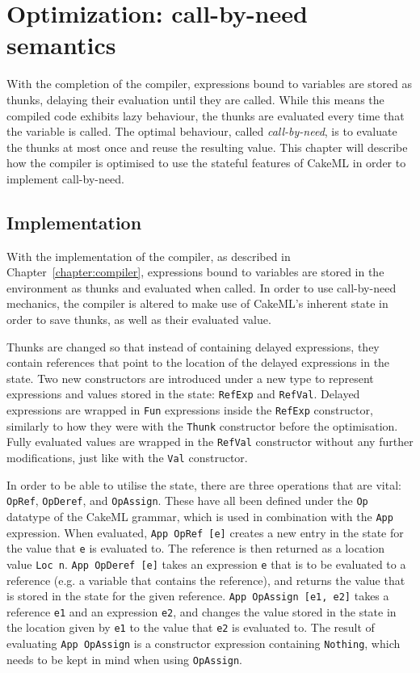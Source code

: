 \chapter{Optimization: call-by-need semantics}
With the completion of the compiler, expressions bound to variables are stored
as thunks, delaying their evaluation until they are called. While this means
the compiled code exhibits lazy behaviour, the thunks are evaluated every
time that the variable is called. The optimal behaviour, called
\textit{call-by-need}, is to evaluate the thunks at most once and reuse the
resulting value. This chapter will describe how the compiler is optimised to
use the stateful features of CakeML in order to implement call-by-need.

\section{Implementation}
\label{cbn:impl}
With the implementation of the compiler, as described in
Chapter~\ref{chapter:compiler}, expressions bound to variables are stored
in the environment as thunks and evaluated when called. In order to use
call-by-need mechanics, the compiler is altered to make use of CakeML's
inherent state in order to save thunks, as well as their evaluated value.

Thunks are changed so that instead of containing delayed expressions, they
contain references that point to the location of the delayed expressions in
the state. Two new constructors are introduced under a new type to represent
expressions and values stored in the state: \texttt{RefExp} and \texttt{RefVal}.
Delayed expressions are wrapped in \texttt{Fun} expressions inside the
\texttt{RefExp} constructor, similarly to how they were with the \texttt{Thunk}
constructor before the optimisation. Fully evaluated values are wrapped in the
\texttt{RefVal} constructor without any further modifications, just like with
the \texttt{Val} constructor.

In order to be able to utilise the state, there are three operations that are
vital: \texttt{OpRef}, \texttt{OpDeref}, and \texttt{OpAssign}. These have all
been defined under the \texttt{Op} datatype of the CakeML grammar, which is used
in combination with
the \texttt{App} expression. When evaluated, \texttt{App OpRef [e]} creates a new
entry in the state for the value that \texttt{e} is evaluated to. The reference
is then returned as a location value \texttt{Loc n}. \texttt{App OpDeref [e]}
takes an expression \texttt{e} that is to be evaluated to a reference (e.g. a
variable that contains the reference), and returns the value that is stored in
the state for the given reference. \texttt{App OpAssign [e1, e2]} takes a
reference \texttt{e1} and an expression \texttt{e2}, and changes the value
stored in the state in the location given by \texttt{e1} to the value that
\texttt{e2} is evaluated to. The result of evaluating \texttt{App OpAssign}
is a constructor expression containing \texttt{Nothing}, which needs to be
kept in mind when using \texttt{OpAssign}.

